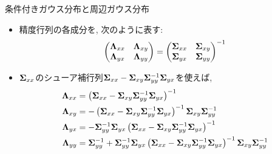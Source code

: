 \documentclass[dvipdfmx,notheorems,t]{beamer}
\begin{document}
\begin{frame}{条件付きガウス分布と周辺ガウス分布}
\begin{itemize}
  \item 精度行列の各成分を, 次のように表す:
  \begin{align*}
    \mqty(\vb{\Lambda}_{xx} & \vb{\Lambda}_{xy} \\
      \vb{\Lambda}_{yx} & \vb{\Lambda}_{yy})
      = \mqty(\vb{\Sigma}_{xx} & \vb{\Sigma}_{xy} \\
        \vb{\Sigma}_{yx} & \vb{\Sigma}_{yy})^{-1}
  \end{align*}
  \item $\vb{\Sigma}_{xx}$のシューア補行列$\vb{\Sigma}_{xx} - \vb{\Sigma}_{xy} \vb{\Sigma}_{yy}^{-1} \vb{\Sigma}_{yx}$を使えば,
  \begin{align*}
    \vb{\Lambda}_{xx} &= \left(
      \vb{\Sigma}_{xx} - \vb{\Sigma}_{xy} \vb{\Sigma}_{yy}^{-1} \vb{\Sigma}_{yx} \right)^{-1} \\
    \vb{\Lambda}_{xy} &= -\left(
      \vb{\Sigma}_{xx} - \vb{\Sigma}_{xy} \vb{\Sigma}_{yy}^{-1} \vb{\Sigma}_{yx} \right)^{-1}
      \vb{\Sigma}_{xy} \vb{\Sigma}_{yy}^{-1} \\
    \vb{\Lambda}_{yx} &= -\vb{\Sigma}_{yy}^{-1} \vb{\Sigma}_{yx} \left(
      \vb{\Sigma}_{xx} - \vb{\Sigma}_{xy} \vb{\Sigma}_{yy}^{-1} \vb{\Sigma}_{yx} \right)^{-1} \\
    \vb{\Lambda}_{yy} &= \vb{\Sigma}_{yy}^{-1} + \vb{\Sigma}_{yy}^{-1} \vb{\Sigma}_{yx} \left(
      \vb{\Sigma}_{xx} - \vb{\Sigma}_{xy} \vb{\Sigma}_{yy}^{-1} \vb{\Sigma}_{yx} \right)^{-1}
      \vb{\Sigma}_{xy} \vb{\Sigma}_{yy}^{-1}
  \end{align*}
\end{itemize}
\end{frame}
\end{document}

